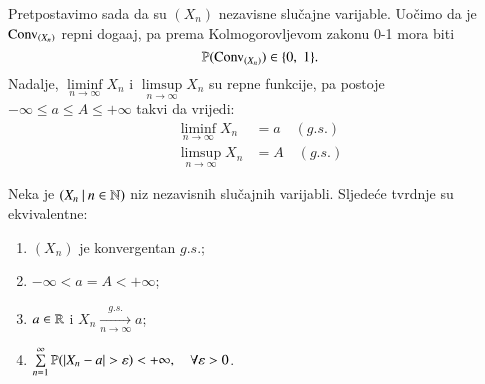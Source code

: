 Pretpostavimo sada da su $(X_n)$ nezavisne slu\v cajne varijable.
Uo\v cimo da je $\mathrm{Conv}_{(X_n)}$ repni doga\dj aj, pa prema Kolmogorovljevom zakonu 0-1 mora biti
\begin{equation}    \label{jed:11.7}
    \mathbb{P}({\mathrm{Conv}_{(X_n)}}) \in \{ 0, \; 1 \}.
\end{equation}
Nadalje, $\liminf\limits_{n \to \infty} X_n$ i $\limsup\limits_{n \to \infty} X_n$ su repne funkcije, pa postoje $- \infty \leq a \leq A \leq +\infty$ takvi da vrijedi:
\begin{equation}
    \begin{aligned}
        \liminf\limits_{n \to \infty} X_n &= a \quad (g.s.)\\
        \limsup\limits_{n \to \infty} X_n &= A \quad (g.s.)
    \end{aligned}
\end{equation}

\begin{tm}  \label{tm:11.9}
    Neka je $({X_n} \: | \: {n \in \mathbb{N}})$ niz nezavisnih slu\v cajnih varijabli.
    Sljede\' ce tvrdnje su ekvivalentne:
    \begin{enumerate}[label=(\roman*)]
        \item $(X_n)$ je konvergentan $g.s.$;
        \item $-\infty < a = A < +\infty$;
        \item $a \in \mathbb{R}$ i $X_n \xrightarrow[n \to \infty]{g.s.} a$;
        \item $\sum\limits_{n = 1}^{\infty} \mathbb{P}({|X_n - a| > \varepsilon}) < +\infty, \quad \forall \varepsilon > 0$.
    \end{enumerate}
\end{tm}